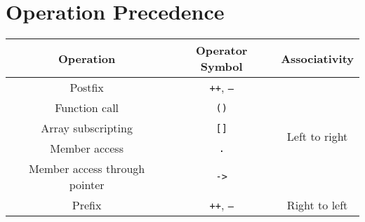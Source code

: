 \documentclass[a4paper]{report}
\begin{document}
\section{Operation Precedence}
\begin{table}[H]
    \centering
    \begin{tabular}{c c c}
        \toprule
        \textbf{Operation}            & \textbf{Operator Symbol}                                                                                                                                                                                                  & \textbf{Associativity}         \\
        \midrule
        Postfix                       & \texttt{++}, \texttt{--}                                                                                                                                                                                    & \multirow{5}{*}{Left to right} \\
        Function call                 & \texttt{()}                                                                                                                                                                                                        &                                \\
        Array subscripting            & \texttt{[]}                                                                                                                                                                                                        &                                \\
        Member access                 & \texttt{.}                                                                                                                                                                                                         &                                \\
        Member access through pointer & \texttt{->}                                                                                                                                                                                                        &                                \\
        \midrule
        Prefix                        & \texttt{++}, \texttt{--}                                                                                                                                                                                    & \multirow{7}{*}{Right to left} \\

\end{tabular}
\end{table}
\end{document}
